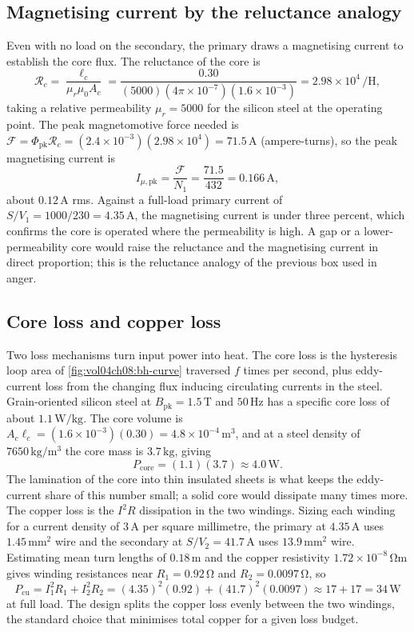 \subsection{Magnetising current by the reluctance analogy}

Even with no load on the secondary, the primary draws a magnetising
current to establish the core flux. The reluctance of the core is
\[
\mathcal{R}_c = \frac{\ell_c}{\mu_r\mu_0 A_c} = \frac{0.30}{(5000)
(4\pi\times 10^{-7})(1.6\times 10^{-3})} = 2.98\times 10^{4}\,\si{\per
\henry},
\]
taking a relative permeability $\mu_r = 5000$ for the silicon steel at
the operating point. The peak magnetomotive force needed is $\mathcal{F}
= \Phi_{\text{pk}}\mathcal{R}_c = (2.4\times 10^{-3})(2.98\times 10^{4})
= 71.5\,\si{\ampere}$ (ampere-turns), so the peak magnetising current is
\[
I_{\mu,\text{pk}} = \frac{\mathcal{F}}{N_1} = \frac{71.5}{432} =
0.166\,\si{\ampere},
\]
about $0.12\,\si{\ampere}$ rms. Against a full-load primary current of
$S/V_1 = 1000/230 = 4.35\,\si{\ampere}$, the magnetising current is
under three percent, which confirms the core is operated where the
permeability is high. A gap or a lower-permeability core would raise the
reluctance and the magnetising current in direct proportion; this is the
reluctance analogy of the previous box used in anger.

\subsection{Core loss and copper loss}

Two loss mechanisms turn input power into heat. The core loss is the
hysteresis loop area of \cref{fig:vol04ch08:bh-curve} traversed $f$
times per second, plus eddy-current loss from the changing flux inducing
circulating currents in the steel. Grain-oriented silicon steel at
$B_{\text{pk}} = 1.5\,\si{\tesla}$ and $50\,\text{Hz}$ has a specific
core loss of about $1.1\,\si{\watt\per\kilogram}$. The core volume is
$A_c\ell_c = (1.6\times 10^{-3})(0.30) = 4.8\times 10^{-4}\,\si{\meter
\cubed}$, and at a steel density of $7650\,\si{\kilogram\per\meter
\cubed}$ the core mass is $3.7\,\si{\kilogram}$, giving
\[
P_{\text{core}} = (1.1)(3.7) \approx 4.0\,\si{\watt}.
\]
The lamination of the core into thin insulated sheets is what keeps the
eddy-current share of this number small; a solid core would dissipate
many times more. The copper loss is the $I^{2}R$ dissipation in the two
windings. Sizing each winding for a current density of $3\,\si{\ampere}
$ per square millimetre, the primary at $4.35\,\si{\ampere}$ uses
$1.45\,\si{\milli\meter\squared}$ wire and the secondary at
$S/V_2 = 41.7\,\si{\ampere}$ uses $13.9\,\si{\milli\meter\squared}$
wire. Estimating mean turn lengths of $0.18\,\si{\meter}$ and the
copper resistivity $1.72\times 10^{-8}\,\si{\ohm\meter}$ gives winding
resistances near $R_1 = 0.92\,\si{\ohm}$ and $R_2 = 0.0097\,\si{\ohm}$,
so
\[
P_{\text{cu}} = I_1^{2}R_1 + I_2^{2}R_2 = (4.35)^{2}(0.92) +
(41.7)^{2}(0.0097) \approx 17 + 17 = 34\,\si{\watt}
\]
at full load. The design splits the copper loss evenly between the two
windings, the standard choice that minimises total copper for a given
loss budget.

